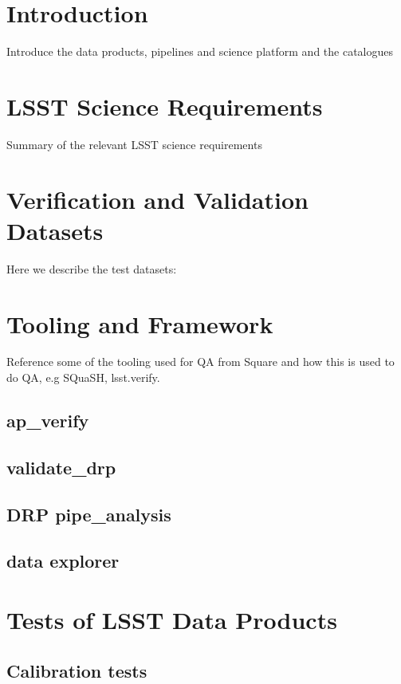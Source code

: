 
\section{Introduction}

Introduce the data products, pipelines and science platform and the catalogues

\section{LSST Science Requirements}
 
 Summary of the relevant LSST science requirements 
 
\section{Verification and Validation Datasets} 

Here we describe the test datasets: \cite{DMTN-091}

\section{Tooling  and Framework} 

Reference some of the  tooling used  for QA  from Square \cite{pstn-023} and how this is used to do QA, e.g SQuaSH, lsst.verify. 

\subsection{ap\_verify} 

\subsection{validate\_drp}

\subsection{ DRP pipe\_analysis}

\subsection{data explorer}

\section{Tests of LSST Data Products } 

\subsection{Calibration tests }

